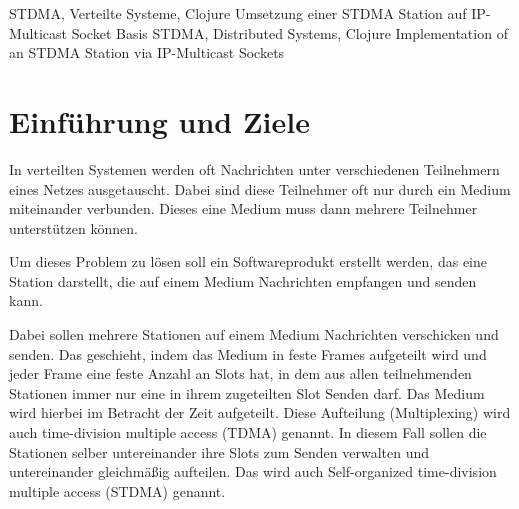 \documentclass[draft=false
              ,paper=a4
              ,twoside=false
              ,fontsize=11pt
              ,headsepline
              ,BCOR10mm
              ,DIV11
              ]{scrbook}
\begin{document}


\frontmatter

\maketitle

\onehalfspacing

\HAWAbstractPage
{STDMA, Verteilte Systeme, Clojure}%
{Umsetzung einer STDMA Station auf IP-Multicast Socket Basis}%
{STDMA, Distributed Systems, Clojure}%
{Implementation of an STDMA Station via IP-Multicast Sockets}%

\newpage
\singlespacing

\tableofcontents
\newpage

\mainmatter
\onehalfspacing

\chapter{Einführung und Ziele}
In verteilten Systemen werden oft Nachrichten unter verschiedenen Teilnehmern eines Netzes ausgetauscht. Dabei sind diese Teilnehmer oft nur durch ein Medium miteinander verbunden. Dieses eine Medium muss dann mehrere Teilnehmer unterstützen können.

Um dieses Problem zu lösen soll ein Softwareprodukt erstellt werden, das eine Station darstellt, die auf einem Medium Nachrichten empfangen und senden kann.

Dabei sollen mehrere Stationen auf einem Medium Nachrichten verschicken und senden. Das geschieht, indem das Medium in feste Frames aufgeteilt wird und jeder Frame eine feste Anzahl an Slots hat, in dem aus allen teilnehmenden Stationen immer nur eine in ihrem zugeteilten Slot Senden darf. Das Medium wird hierbei im Betracht der Zeit aufgeteilt. Diese Aufteilung (Multiplexing) wird auch time-division multiple access (TDMA) genannt.
In diesem Fall sollen die Stationen selber untereinander ihre Slots zum Senden verwalten und untereinander gleichmäßig aufteilen.
Das wird auch Self-organized time-division multiple access (STDMA) genannt.
\end{document}
